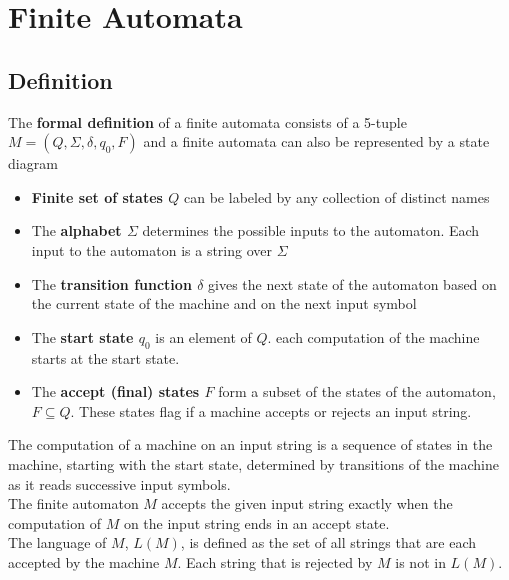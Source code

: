 \documentclass{article}
\begin{document}
\section{Finite Automata}
\label{sec:finiteAutomata}
\subsection{Definition}
The \textbf{formal definition} of a finite automata consists of a 5-tuple $M=(Q,\Sigma,\delta,q_0,F)$ and a finite automata can also be represented by a state diagram
\begin{itemize}
\item \textbf{Finite set of states $Q$} can be labeled by any collection of distinct names
\item The \textbf{alphabet $\Sigma$} determines the possible inputs to the automaton. Each input to the automaton is a string over $\Sigma$
\item The \textbf{transition function $\delta$} gives the next state of the automaton based on the current state of the machine and on the next input symbol
\item The \textbf{start state $q_0$} is an element of $Q$. each computation of the machine starts at the start state.
\item The \textbf{accept (final) states $F$} form a subset of the states of the automaton, $F\subseteq Q$. These states flag if a machine accepts or rejects an input string.
\end{itemize}
The computation of a machine on an input string is a sequence of states in the machine, starting with the start state, determined by transitions of the machine as it reads successive input symbols.\\
\newline
The finite automaton $M$ accepts the given input string exactly when the computation of $M$ on the input string ends in an accept state.\\
\newline
The language of $M$, $L(M)$, is defined as the set of all strings that are each accepted by the machine $M$. Each string that is rejected by $M$ is not in $L(M)$.
\end{document}
